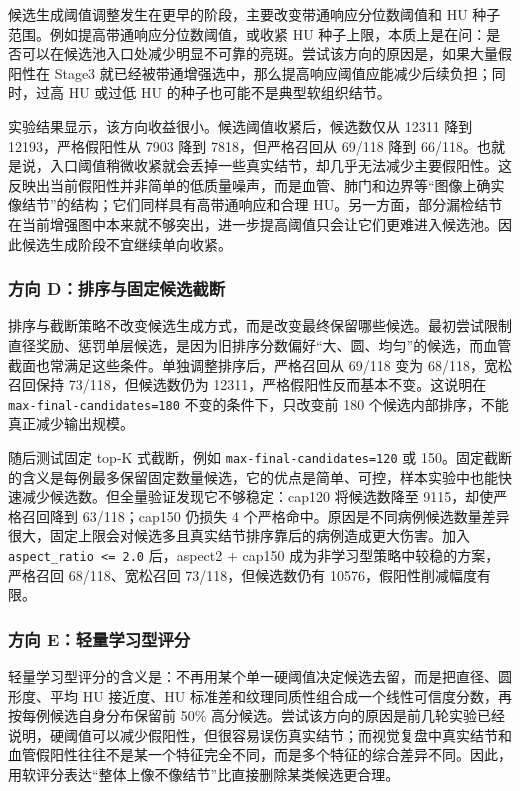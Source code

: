 \documentclass[UTF8,zihao=-4,fontset=none]{ctexart}
\newcommand{\code}[1]{\texttt{#1}}
\begin{document}
候选生成阈值调整发生在更早的阶段，主要改变带通响应分位数阈值和 HU 种子范围。例如提高带通响应分位数阈值，或收紧 HU 种子上限，本质上是在问：是否可以在候选池入口处减少明显不可靠的亮斑。尝试该方向的原因是，如果大量假阳性在 Stage3 就已经被带通增强选中，那么提高响应阈值应能减少后续负担；同时，过高 HU 或过低 HU 的种子也可能不是典型软组织结节。

实验结果显示，该方向收益很小。候选阈值收紧后，候选数仅从 12311 降到 12193，严格假阳性从 7903 降到 7818，但严格召回从 69/118 降到 66/118。也就是说，入口阈值稍微收紧就会丢掉一些真实结节，却几乎无法减少主要假阳性。这反映出当前假阳性并非简单的低质量噪声，而是血管、肺门和边界等“图像上确实像结节”的结构；它们同样具有高带通响应和合理 HU。另一方面，部分漏检结节在当前增强图中本来就不够突出，进一步提高阈值只会让它们更难进入候选池。因此候选生成阶段不宜继续单向收紧。

\subsubsection{方向 D：排序与固定候选截断}

排序与截断策略不改变候选生成方式，而是改变最终保留哪些候选。最初尝试限制直径奖励、惩罚单层候选，是因为旧排序分数偏好“大、圆、均匀”的候选，而血管截面也常满足这些条件。单独调整排序后，严格召回从 69/118 变为 68/118，宽松召回保持 73/118，但候选数仍为 12311，严格假阳性反而基本不变。这说明在 \code{max-final-candidates=180} 不变的条件下，只改变前 180 个候选内部排序，不能真正减少输出规模。

随后测试固定 top-K 式截断，例如 \code{max-final-candidates=120} 或 150。固定截断的含义是每例最多保留固定数量候选，它的优点是简单、可控，样本实验中也能快速减少候选数。但全量验证发现它不够稳定：cap120 将候选数降至 9115，却使严格召回降到 63/118；cap150 仍损失 4 个严格命中。原因是不同病例候选数量差异很大，固定上限会对候选多且真实结节排序靠后的病例造成更大伤害。加入 \code{aspect\_ratio <= 2.0} 后，aspect2 + cap150 成为非学习型策略中较稳的方案，严格召回 68/118、宽松召回 73/118，但候选数仍有 10576，假阳性削减幅度有限。

\subsubsection{方向 E：轻量学习型评分}

轻量学习型评分的含义是：不再用某个单一硬阈值决定候选去留，而是把直径、圆形度、平均 HU 接近度、HU 标准差和纹理同质性组合成一个线性可信度分数，再按每例候选自身分布保留前 50\% 高分候选。尝试该方向的原因是前几轮实验已经说明，硬阈值可以减少假阳性，但很容易误伤真实结节；而视觉复盘中真实结节和血管假阳性往往不是某一个特征完全不同，而是多个特征的综合差异不同。因此，用软评分表达“整体上像不像结节”比直接删除某类候选更合理。
\end{document}
